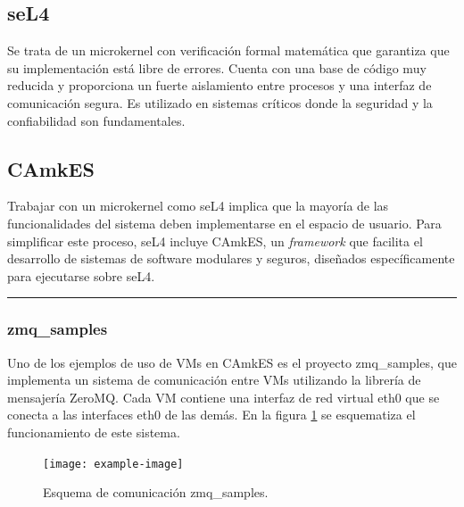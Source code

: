 \subsection{seL4}
Se trata de un microkernel con verificación formal matemática que garantiza que su implementación está libre de errores. Cuenta con una base de código muy reducida y proporciona un fuerte aislamiento entre procesos y una interfaz de comunicación segura. Es utilizado en sistemas críticos donde la seguridad y la confiabilidad son fundamentales. 

\subsection{CAmkES}
Trabajar con un microkernel como seL4 implica que la mayoría de las funcionalidades del sistema deben implementarse en el espacio de usuario. Para simplificar este proceso, seL4 incluye CAmkES, un \textit{framework} que facilita el desarrollo de sistemas de software modulares y seguros, diseñados específicamente para ejecutarse sobre seL4.





\noindent\rule{\textwidth}{0.4pt}

\subsubsection{zmq\_samples}
Uno de los ejemplos de uso de VMs en CAmkES es el proyecto zmq\_samples, que implementa un sistema de comunicación entre VMs utilizando la librería de mensajería ZeroMQ. Cada VM contiene una interfaz de red virtual eth0 que se conecta a las interfaces eth0 de las demás. En la figura \ref{diag:zmq_samples} se esquematiza el funcionamiento de este sistema.

\begin{figure}[h!]
    \centering
    \texttt{[image: example-image]}
    \caption{Esquema de comunicación zmq\_samples.}
    \label{diag:zmq_samples}
\end{figure}

